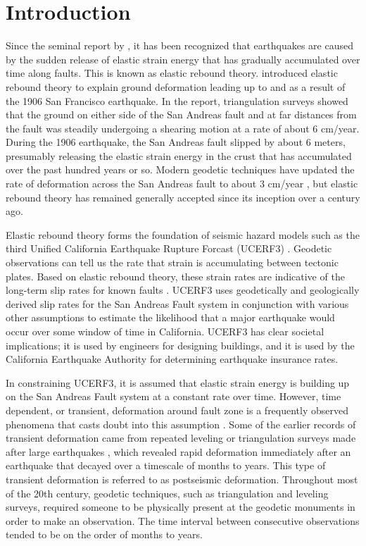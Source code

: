 \chapter{Introduction}


Since the seminal report by \citet{Reid1910}, it has been recognized
that earthquakes are caused by the sudden release of elastic strain
energy that has gradually accumulated over time along faults. This is
known as elastic rebound theory. \citet{Reid1910} introduced elastic
rebound theory to explain ground deformation leading up to and as a
result of the 1906 San Francisco earthquake. In the report,
triangulation surveys showed that the ground on either side of the San
Andreas fault and at far distances from the fault was steadily
undergoing a shearing motion at a rate of about 6 cm/year. During the
1906 earthquake, the San Andreas fault slipped by about 6 meters,
presumably releasing the elastic strain energy in the crust that has
accumulated over the past hundred years or so. Modern geodetic
techniques have updated the rate of deformation across the San Andreas
fault to about 3 cm/year \citep{Savage1973}, but elastic rebound
theory has remained generally accepted since its inception over a
century ago.

Elastic rebound theory forms the foundation of seismic hazard models
such as the third Unified California Earthquake Rupture Forcast
(UCERF3) \citep{Field2014}. Geodetic observations can tell us the rate
that strain is accumulating between tectonic plates. Based on elastic
rebound theory, these strain rates are indicative of the long-term
slip rates for known faults \citep[e.g.,][]{Savage1973,Meade2005}.
UCERF3 uses geodetically and geologically derived slip rates for the
San Andreas Fault system in conjunction with various other assumptions
to estimate the likelihood that a major earthquake would occur over
some window of time in California. UCERF3 has clear societal
implications; it is used by engineers for designing buildings, and it
is used by the California Earthquake Authority for determining
earthquake insurance rates.

In constraining UCERF3, it is assumed that elastic strain energy is
building up on the San Andreas Fault system at a constant rate over
time. However, time dependent, or transient, deformation around fault
zone is a frequently observed phenomena that casts doubt into this
assumption \citep{Thatcher1983}. Some of the earlier records of
transient deformation came from repeated leveling or triangulation
surveys made after large earthquakes \citep[e.g.,][]{Tsuboi1932,
Smith1968}, which revealed rapid deformation immediately after an
earthquake that decayed over a timescale of months to years. This type
of transient deformation is referred to as postseismic deformation.
Throughout most of the 20th century, geodetic techniques, such as
triangulation and leveling surveys, required someone to be physically
present at the geodetic monuments in order to make an observation. The
time interval between consecutive observations tended to be on the
order of months to years. 

